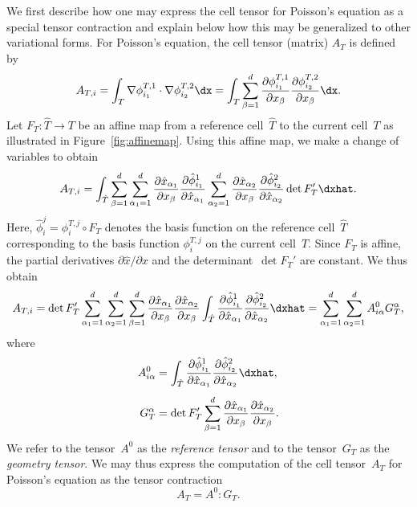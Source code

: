 We first describe how one may express the cell tensor for Poisson's
equation as a special tensor contraction and explain below how this
may be generalized to other variational forms. For Poisson's equation,
the cell tensor (matrix) $A_T$ is defined by
\begin{equation}
  A_{T,i} =
  \int_T
  \nabla \phi_{i_1}^{T,1} \cdot
  \nabla \phi_{i_2}^{T,2} \dx
  =
  \int_T
  \sum_{\beta=1}^d
  \frac{\partial \phi_{i_1}^{T,1}}{\partial x_{\beta}}
  \frac{\partial \phi_{i_2}^{T,2}}{\partial x_{\beta}} \dx.
\end{equation}
Let $F_T : \hat{T} \rightarrow T$ be an affine map from a
reference cell~$\hat{T}$ to the current cell~$T$ as illustrated in
Figure~\ref{fig:affinemap}. Using this affine map, we make a change of
variables to obtain
\begin{equation}
  A_{T,i} =
  \int_{\hat{T}}
  \sum_{\beta=1}^d
  \sum_{\alpha_1=1}^d
  \frac{\partial \hat{x}_{\alpha_1}}{\partial x_{\beta}}
  \frac{\partial \hat{\phi}^1_{i_1}}{\partial \hat{x}_{\alpha_1}}
  \sum_{\alpha_2=1}^d
  \frac{\partial \hat{x}_{\alpha_2}}{\partial x_{\beta}}
  \frac{\partial \hat{\phi}^2_{i_2}}{\partial \hat{x}_{\alpha_2}}
  \det F_T'
  \dxhat.
\end{equation}
Here, $\hat{\phi}_i^j = \phi_i^{T,j} \circ F_T$ denotes the basis function
on the reference cell~$\hat{T}$ corresponding to the basis function
$\phi_i^{T,j}$ on the current cell~$T$. Since $F_T$ is affine, the
partial derivatives $\partial \hat{x} / \partial x$ and the determinant~$\det F_T'$
are constant. We thus obtain
\begin{equation}
  A_{T,i} =
  \det F_T'
  \sum_{\alpha_1=1}^d
  \sum_{\alpha_2=1}^d
  \sum_{\beta=1}^d
  \frac{\partial \hat{x}_{\alpha_1}}{\partial x_{\beta}}
  \frac{\partial \hat{x}_{\alpha_2}}{\partial x_{\beta}}
  \int_{\hat{T}}
  \frac{\partial \hat{\phi}^1_{i_1}}{\partial \hat{x}_{\alpha_1}}
  \frac{\partial \hat{\phi}^2_{i_2}}{\partial \hat{x}_{\alpha_2}}
  \dxhat
  =
  \sum_{\alpha_1=1}^d
  \sum_{\alpha_2=1}^d
  A^0_{i\alpha} G_T^{\alpha},
\end{equation}
where\vspace*{4pt}
\begin{equation} \label{eq:poisson,AandG}
  \begin{split}
    A^0_{i\alpha}
    &=
    \int_{\hat{T}}
    \frac{\partial \hat{\phi}^1_{i_1}}{\partial \hat{x}_{\alpha_1}}
    \frac{\partial \hat{\phi}^2_{i_2}}{\partial \hat{x}_{\alpha_2}}
    \dxhat, \\[4pt]
    G_T^{\alpha}&=\det F_T'
    \sum_{\beta=1}^d
    \frac{\partial \hat{x}_{\alpha_1}}{\partial x_{\beta}}
    \frac{\partial \hat{x}_{\alpha_2}}{\partial x_{\beta}}.
  \end{split}\vspace*{2pt}
\end{equation}
We refer to the tensor~$A^0$ as the \emph{reference tensor} and to the
tensor~$G_T$ as the \emph{geometry tensor}. We may thus express the
computation of the cell tensor~$A_T$ for Poisson's equation as the
tensor contraction
\begin{equation}
  A_T = A^0 : G_T.
\end{equation}


